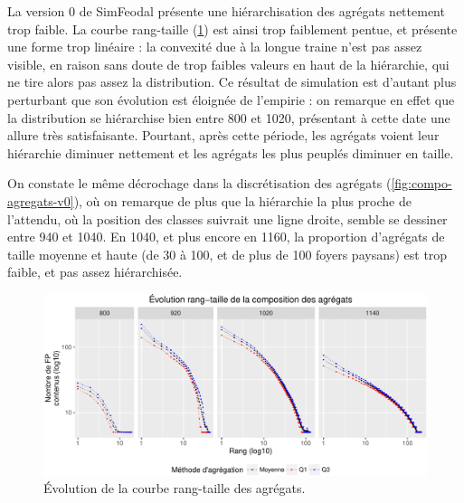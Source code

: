 
\begin{mdframed}[backgroundcolor=gray!10,footnoteinside=false]
	La version 0 de SimFeodal présente une hiérarchisation des agrégats nettement trop faible. La courbe rang-taille (\cref{fig:rt-agregats-v0}) est ainsi trop faiblement pentue, et présente une forme trop linéaire : la convexité due à la longue traine n'est pas assez visible, en raison sans doute de trop faibles valeurs  en haut de la hiérarchie, qui ne \og tire\fg{} alors pas assez la distribution.
	Ce résultat de simulation est d'autant plus perturbant que son évolution est éloignée de l'empirie : on remarque en effet que la distribution se hiérarchise bien entre 800 et 1020, présentant à cette date une allure très satisfaisante. Pourtant, après cette période, les agrégats voient leur hiérarchie diminuer nettement et les agrégats les plus peuplés diminuer en taille.
	
	On constate le même décrochage dans la discrétisation des agrégats (\cref{fig:compo-agregats-v0}), où on remarque de plus que la hiérarchie la plus proche de l'attendu, où la position des classes suivrait une ligne droite, semble se dessiner entre 940 et 1040. En 1040, et plus encore en 1160, la proportion d'agrégats de taille moyenne et haute (de 30 à 100, et de plus de 100 foyers paysans) est trop faible, et pas assez hiérarchisée.
	
\end{mdframed}

\begin{figure}[H]
	\captionsetup{width=\linewidth}
	\includegraphics[width=.8\linewidth]{img/resultats/v0_rt_agregats.pdf}
	\caption{Évolution de la courbe rang-taille des agrégats.} 
	\label{fig:rt-agregats-v0} 
\end{figure}


